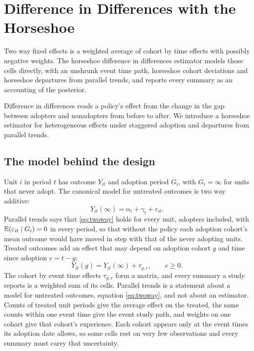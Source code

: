 \chapter{Difference in Differences with the Horseshoe}\label{ch:did}

\begin{tcolorbox}[colback=gray!6,colframe=gray!50,title=In brief,fonttitle=\normalfont\itshape,coltitle=black,colbacktitle=gray!15,boxrule=0.4pt,arc=1pt]
Two way fixed effects is a weighted average of cohort by time effects with possibly negative weights. The horseshoe difference in differences estimator models those cells directly, with an unshrunk event time path, horseshoe cohort deviations and horseshoe departures from parallel trends, and reports every summary as an accounting of the posterior.
\end{tcolorbox}

Difference in differences reads a policy's effect from the change in the gap between adopters and nonadopters from before to after. We introduce a horseshoe estimator for heterogeneous effects under staggered adoption and departures from parallel trends.

\section{The model behind the design}

Unit $i$ in period $t$ has outcome $Y_{it}$ and adoption period $G_i$, with $G_i = \infty$ for units that never adopt. The canonical model for untreated outcomes is two way additive:
\begin{equation}
Y_{it}(\infty) = \alpha_i + \gamma_t + \varepsilon_{it}.
\label{eq:twoway}
\end{equation}
Parallel trends says that \eqref{eq:twoway} holds for every unit, adopters included, with $\mathbb{E}(\varepsilon_{it}\mid G_i) = 0$ in every period, so that without the policy each adoption cohort's mean outcome would have moved in step with that of the never adopting units. Treated outcomes add an effect that may depend on adoption cohort $g$ and time since adoption $e = t - g$:
\[
Y_{it}(g) = Y_{it}(\infty) + \tau_{g,e}, \qquad e \geq 0.
\]
The cohort by event time effects $\tau_{g,e}$ form a matrix, and every summary a study reports is a weighted sum of its cells. Parallel trends is a statement about a model for untreated outcomes, equation \eqref{eq:twoway}, and not about an estimator. Counts of treated unit periods give the average effect on the treated, the same counts within one event time give the event study path, and weights on one cohort give that cohort's experience. Each cohort appears only at the event times its adoption date allows, so some cells rest on very few observations and every summary must carry that uncertainty.

